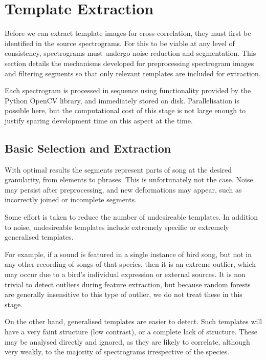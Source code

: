 \section{Template Extraction}
Before we can extract template images for cross-correlation, they must first be
identified in the source spectrograms.
For this to be viable at any level of consistency, spectrograms must undergo
noise reduction and segmentation.
This section details the mechanisms developed for preprocessing spectrogram
images and filtering segments so that only relevant templates are included for
extraction.

Each spectrogram is processed in sequence using functionality provided by the
Python OpenCV library, and immediately stored on disk.
Parallelisation is possible here, but the computational cost of this stage is
not large enough to justify sparing development time on this aspect at the time.



\subsection{Basic Selection and Extraction}\label{sec:template_select}
With optimal results the segments represent parts of song at the desired
granularity, from elements to phrases.
This is unfortunately not the case.
Noise may persist after preprocessing, and new deformations may appear, such as
incorrectly joined or incomplete segments.

Some effort is taken to reduce the number of undesireable templates.
In addition to noise, undesireable templates include extremely specific or
extremely generalised templates.

For example, if a sound is featured in a single instance of bird song, but not
in any other recording of songs of that species, then it is an extreme outlier,
which may occur due to a bird's individual expression or external sources.
It is non trivial to detect outliers during feature extraction, but because
random forests are generally insensitive to this type of outlier, we do not
treat these in this stage.

On the other hand, generalised templates are easier to detect.
Such templates will have a very faint structure (low contrast), or a complete
lack of structure.
These may be analysed directly and ignored, as they are likely to correlate,
although very weakly, to the majority of spectrograms irrespective of the
species.

